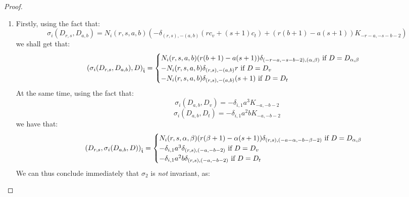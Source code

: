             \begin{proof}
                \begin{enumerate}
                    \item Firstly, using the fact that:
                        $$\sigma_i(D_{r, s}, D_{a, b}) = N_i(r, s, a, b) \left( -\delta_{(r, s), -(a, b)} (r c_v + (s + 1) c_t) + ( r(b + 1) - a(s + 1) )K_{-r - a, -s - b - 2} \right)$$
                    we shall get that:
                        $$
                            \left( \sigma_i(D_{r, s}, D_{a, b}), D \right)_{\hat{\mathfrak{t}}} =
                            \begin{cases}
                                \text{$N_i(r, s, a, b) ( r(b + 1) - a(s + 1) ) \delta_{(-r - a, -s - b - 2), (\alpha, \beta)}$ if $D = D_{\alpha, \beta}$}
                                \\
                                \text{$-N_i(r, s, a, b) \delta_{(r, s), -(a, b)} r$ if $D = D_v$}
                                \\
                                \text{$-N_i(r, s, a, b) \delta_{(r, s), -(a, b)} (s + 1)$ if $D = D_t$}
                            \end{cases}
                        $$
                    At the same time, using the fact that:
                        $$\sigma_i(D_{a, b}, D_v) = -\delta_{i, 1} a^3 K_{-a, -b - 2}$$
                        $$\sigma_i(D_{a, b}, D_t) = - \delta_{i, 1} a^2b K_{-a, -b - 2}$$
                    we have that:
                        $$
                            \begin{aligned}
                                \left( D_{r, s}, \sigma_i(D_{a, b}, D) \right)_{\hat{\mathfrak{t}}} =
                                \begin{cases}
                                    \text{$N_i(r, s, \alpha, \beta) ( r(\beta + 1) - \alpha(s + 1) ) \delta_{(r, s), (-a - \alpha, -b - \beta - 2)}$ if $D = D_{\alpha, \beta}$}
                                    \\
                                    \text{$-\delta_{i, 1} a^3 \delta_{(r, s), (-a, -b - 2)}$ if $D = D_v$}
                                    \\
                                    \text{$-\delta_{i, 1} a^2 b \delta_{(r, s), (-a, -b - 2)}$ if $D = D_t$}
                                \end{cases}
                            \end{aligned}
                        $$
                    We can thus conclude immediately that $\sigma_2$ is \textit{not} invariant, as:

\end{enumerate}
\end{proof}
